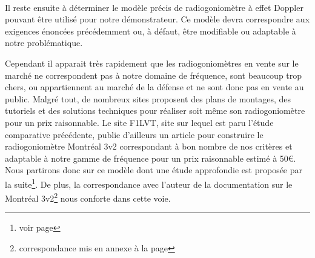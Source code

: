 ~\\


Il reste ensuite à déterminer le modèle précis de radiogoniomètre à effet Doppler pouvant être utilisé pour notre démonstrateur. Ce modèle devra correspondre aux exigences énoncées précédemment ou, à défaut, être modifiable ou adaptable à notre problématique.

Cependant il apparait très rapidement que les radiogoniomètres en vente sur le marché ne correspondent pas à notre domaine de fréquence, sont beaucoup trop chers, ou appartiennent au marché de la défense et ne sont donc pas en vente au public. Malgré tout, de nombreux sites proposent des plans de montages, des tutoriels et des solutions techniques pour réaliser soit même son radiogoniomètre pour un prix raisonnable. Le site F1LVT, site sur lequel est paru l'étude comparative précédente, publie d'ailleurs un article pour construire le radiogoniomètre Montréal 3v2 correspondant à bon nombre de nos critères et adaptable à notre gamme de fréquence pour un prix raisonnable estimé à 50\euro. Nous partirons donc sur ce modèle dont une étude approfondie est proposée par la suite\footnote{voir page \pageref{montreal}}. De plus, la correspondance avec l'auteur de la documentation sur le Montréal 3v2\footnote{correspondance mis en annexe à la page \pageref{chap:mail}} nous conforte dans cette voie.

